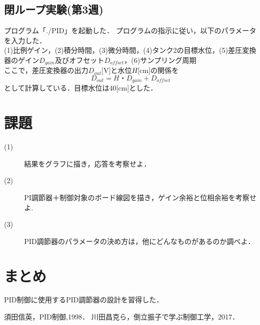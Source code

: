 \documentclass[12pt]{jsarticle}
\begin{document}
\subsection{閉ループ実験(第3週)}
プログラム「./PID」を起動した．
プログラムの指示に従い，以下のパラメータを入力した．\\
(1)比例ゲイン，(2)積分時間，(3)微分時間，(4)タンク2の目標水位，(5)差圧変換器のゲイン$D_{gain}$及びオフセット$D_{offset}$，(6)サンプリング周期\\
ここで，差圧変換器の出力$D_{out}$[V]と水位$H$[cm]の関係を
\begin{equation}
  D_{out} = H・D_{gain} + D_{offset}
\end{equation}
として計算している．目標水位は40[cm]とした．\\

\section{課題}
\begin{description}
\item[(1)]結果をグラフに描き，応答を考察せよ．\\
\item[(2)]PI調節器＋制御対象のボード線図を描き，ゲイン余裕と位相余裕を考察せよ.\\
\item[(3)]PID調節器のパラメータの決め方は，他にどんなものがあるのか調べよ．\\
\end{description}

\section{まとめ}
PID制御に使用するPID調節器の設計を習得した．

\begin{thebibliography}{9}
   須田信英，PID制御,1998．
   川田昌克ら，倒立振子で学ぶ制御工学，2017．
\end{thebibliography}
\end{document}
